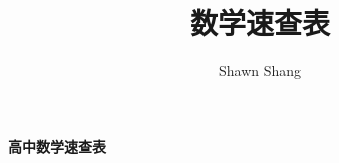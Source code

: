 \documentclass[10pt]{extarticle}
\title{数学速查表}
\author{Shawn Shang}
\begin{document}
\begin{center}{\Large\bfseries 高中数学速查表}\end{center}
\vspace{0.5ex}




\end{document}
